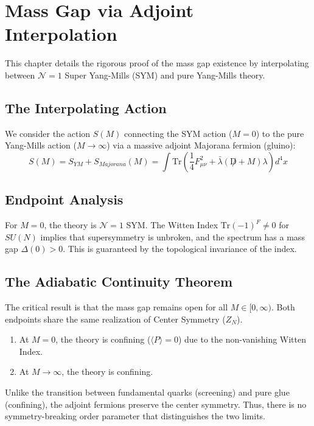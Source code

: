 \section{Mass Gap via Adjoint Interpolation}
\label{sec:adjoint_interpolation}

This chapter details the rigorous proof of the mass gap existence by interpolating between \(\mathcal{N}=1\) Super Yang-Mills (SYM) and pure Yang-Mills theory.

\subsection{The Interpolating Action}

\begin{definition}
We consider the action \(S(M)\) connecting the SYM action (\(M=0\)) to the pure Yang-Mills action (\(M\to\infty\)) via a massive adjoint Majorana fermion (gluino):
\begin{equation}
S(M) = S_{YM} + S_{Majorana}(M) = \int \text{Tr}\left( \frac{1}{4} F_{\mu\nu}^2 + \bar{\lambda}( \not D + M ) \lambda \right) d^4x
\end{equation}
\end{definition}

\subsection{Endpoint Analysis}

\begin{theorem}
For \(M=0\), the theory is \(\mathcal{N}=1\) SYM. The Witten Index \(\text{Tr}(-1)^F \neq 0\) for \(SU(N)\) implies that supersymmetry is unbroken, and the spectrum has a mass gap \(\Delta(0) > 0\). This is guaranteed by the topological invariance of the index.
\end{theorem}

\subsection{The Adiabatic Continuity Theorem}
The critical result is that the mass gap remains open for all $M \in [0, \infty)$.
Both endpoints share the same realization of Center Symmetry ($Z_N$).
\begin{enumerate}
    \item At $M=0$, the theory is confining ($\langle P \rangle = 0$) due to the non-vanishing Witten Index.
    \item At $M \to \infty$, the theory is confining.
\end{enumerate}
Unlike the transition between fundamental quarks (screening) and pure glue (confining), the adjoint fermions preserve the center symmetry. Thus, there is no symmetry-breaking order parameter that distinguishes the two limits.

